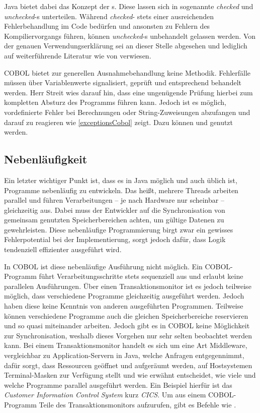 Java bietet dabei das Konzept der s. Diese lassen sich in sogenannte \textit{checked} und \textit{unchecked}-s unterteilen. Während \textit{checked}- stets einer ausreichenden Fehlerbehandlung im Code bedürfen und ansonsten zu Fehlern des Kompiliervorgangs führen, können \textit{unchecked}-s unbehandelt gelassen werden. Von der genauen Verwendungserklärung sei an dieser Stelle abgesehen und lediglich auf weiterführende Literatur wie  von \citeauthor{byrne_java_2009-1} verwiesen.

COBOL bietet zur generellen Ausnahmebehandlung keine Methodik. Fehlerfälle müssen über Variablenwerte signalisiert, geprüft und entsprechend behandelt werden. Herr Streit wies darauf hin, dass eine ungenügende Prüfung hierbei zum kompletten Absturz des Programms führen kann. Jedoch ist es möglich, vordefinierte Fehler bei Berechnungen oder String-Zuweisungen abzufangen und darauf zu reagieren wie \autoref{exceptionsCobol} zeigt. Dazu können  und  genutzt werden.


\subsection{Nebenläufigkeit}

Ein letzter wichtiger Punkt ist, dass es in Java möglich und auch üblich ist, Programme nebenläufig zu entwickeln. Das heißt, mehrere Threads arbeiten parallel und führen Verarbeitungen -- je nach Hardware nur scheinbar -- gleichzeitig aus. Dabei muss der Entwickler auf die Synchronisation von gemeinsam genutzten Speicherbereichen achten, um gültige Datenen zu gewehrleisten. Diese nebenläufige Programmierung birgt zwar ein gewisses Fehlerpotential bei der Implementierung, sorgt jedoch dafür, dass Logik tendenziell effizienter ausgeführt wird.

In COBOL ist diese nebenläufige Ausführung nicht möglich. Ein COBOL-Programm führt Verarbeitungsschritte stets sequenziell aus und erlaubt keine parallelen Ausführungen. Über einen Transaktionsmonitor ist es jedoch teilweise möglich, dass verschiedene Programme gleichzeitig ausgeführt werden. Jedoch haben diese keine Kenntnis von anderen ausgeführten Programmen. Teilweise können verschiedene Programme auch die gleichen Speicherbereiche reservieren und so quasi miteinander arbeiten. Jedoch gibt es in COBOL keine Möglichkeit zur Synchronisation, weshalb dieses Vorgehen nur sehr selten beobachtet werden kann. Bei einem Transaktionsmonitor handelt es sich um eine Art Middleware, vergleichbar zu Application-Servern in Java, welche Anfragen entgegennimmt, dafür sorgt, dass Ressourcen geöffnet und aufgeräumt werden, auf Hostsystemen Terminal-Masken zur Verfügung stellt und wie erwähnt entscheidet, wie viele und welche Programme parallel ausgeführt werden. Ein Beispiel hierfür ist das \textit{Customer Information Control System} kurz \textit{CICS}. Um aus einem COBOL-Programm Teile des Transaktionsmonitors aufzurufen, gibt es Befehle wie . 
